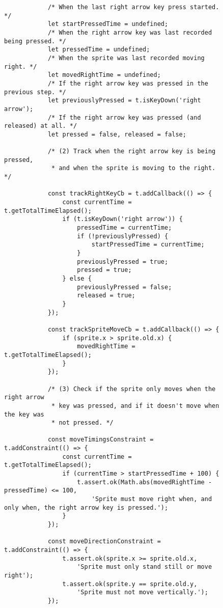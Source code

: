 \begin{listing}[htpb]
\begin{subfigure}[b]{.50\textwidth}
\begin{verbatim}
            /* When the last right arrow key press started. */
            let startPressedTime = undefined;
            /* When the right arrow key was last recorded being pressed. */
            let pressedTime = undefined;
            /* When the sprite was last recorded moving right. */
            let movedRightTime = undefined;
            /* If the right arrow key was pressed in the previous step. */
            let previouslyPressed = t.isKeyDown('right arrow');
            /* If the right arrow key was pressed (and released) at all. */
            let pressed = false, released = false;

            /* (2) Track when the right arrow key is being pressed,
             * and when the sprite is moving to the right. */

            const trackRightKeyCb = t.addCallback(() => {
                const currentTime = t.getTotalTimeElapsed();
                if (t.isKeyDown('right arrow')) {
                    pressedTime = currentTime;
                    if (!previouslyPressed) {
                        startPressedTime = currentTime;
                    }
                    previouslyPressed = true;
                    pressed = true;
                } else {
                    previouslyPressed = false;
                    released = true;
                }
            });

            const trackSpriteMoveCb = t.addCallback(() => {
                if (sprite.x > sprite.old.x) {
                    movedRightTime = t.getTotalTimeElapsed();
                }
            });

            /* (3) Check if the sprite only moves when the right arrow
             * key was pressed, and if it doesn't move when the key was
             * not pressed. */

            const moveTimingsConstraint = t.addConstraint(() => {
                const currentTime = t.getTotalTimeElapsed();
                if (currentTime > startPressedTime + 100) {
                    t.assert.ok(Math.abs(movedRightTime - pressedTime) <= 100,
                        'Sprite must move right when, and only when, the right arrow key is pressed.');
                }
            });

            const moveDirectionConstraint = t.addConstraint(() => {
                t.assert.ok(sprite.x >= sprite.old.x,
                    'Sprite must only stand still or move right');
                t.assert.ok(sprite.y == sprite.old.y,
                    'Sprite must not move vertically.');
            });


\end{verbatim}
\end{subfigure}
\end{listing}
